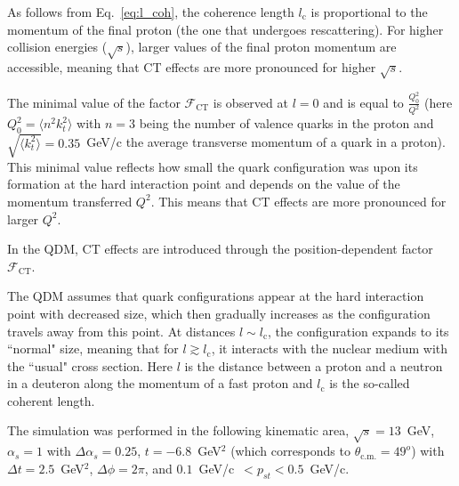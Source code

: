 As follows from Eq.~\ref{eq:l_coh}, the coherence length $l_{\textrm{c}}$ is proportional to the momentum of the final proton (the one that undergoes rescattering). For higher collision energies ($\sqrt{s}$), larger values of the final proton momentum are accessible, meaning that CT effects are more pronounced for higher $\sqrt{s}$.

The minimal value of the factor $\mathcal F_{\textrm{CT}}$ is observed at $l=0$ and is equal to $\frac{Q^{2}_{0}}{Q^{2}}$ (here $Q^{2}_{0}=\langle n^{2}k_{t}^{2}\rangle$ with $n=3$ being the number of valence quarks in the proton and $\sqrt{\langle k_{t}^{2}\rangle}= 0.35$~GeV/c the average transverse momentum of a quark in a proton). This minimal value reflects how small the quark configuration was upon its formation at the hard interaction point and depends on the value of the momentum transferred $Q^{2}$. This means that CT effects are more pronounced for larger $Q^{2}$.


\newpage

In the QDM, CT effects are introduced through the position-dependent factor $\mathcal F_{\textrm{CT}}$.

The QDM assumes that quark conﬁgurations appear at the hard interaction point with decreased size, which then gradually increases as the configuration travels away from this point. At distances $l\sim l_{\textrm{c}}$, the configuration expands to its ``normal" size, meaning that for $l\gtrsim l_{\textrm{c}}$, it interacts with the nuclear medium with the ``usual" cross section. Here $l$ is the distance between a proton and a neutron in a deuteron along the momentum of a fast proton and $l_{\textrm{c}}$ is the so-called coherent length.


The simulation was performed in the following kinematic area, $\sqrt{s}=13$~GeV, $\alpha_{s} =1$ with $\Delta \alpha_{s} = 0.25$, $t=-6.8$~GeV$^2$ (which corresponds to $\theta_{\textrm{c.m.}}=49^{o}$) with $\Delta t = 2.5$~GeV$^{2}$, $\Delta \phi = 2\pi$, and $0.1$~GeV/c~$<p_{st}<0.5$~GeV/c.


